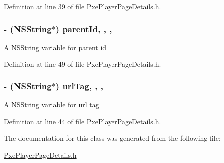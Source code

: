 Definition at line 39 of file Pxe\-Player\-Page\-Details.\-h.

\hypertarget{interface_pxe_player_page_details_a89b10d9e8c8dd323eab65c4675596f80}{
\subsubsection[{parent\-Id}]{\setlength{\rightskip}{0pt plus 5cm}-\/ (N\-S\-String$\ast$) parent\-Id\hspace{0.3cm}{\ttfamily [read]}, {\ttfamily [write]}, {\ttfamily [nonatomic]}, {\ttfamily [retain]}}}\label{interface_pxe_player_page_details_a89b10d9e8c8dd323eab65c4675596f80}
A N\-S\-String variable for parent id 

Definition at line 49 of file Pxe\-Player\-Page\-Details.\-h.

\hypertarget{interface_pxe_player_page_details_ad234d8017a3d5b7d76877bf682b879df}{
\subsubsection[{url\-Tag}]{\setlength{\rightskip}{0pt plus 5cm}-\/ (N\-S\-String$\ast$) url\-Tag\hspace{0.3cm}{\ttfamily [read]}, {\ttfamily [write]}, {\ttfamily [nonatomic]}, {\ttfamily [retain]}}}\label{interface_pxe_player_page_details_ad234d8017a3d5b7d76877bf682b879df}
A N\-S\-String variable for url tag 

Definition at line 44 of file Pxe\-Player\-Page\-Details.\-h.



The documentation for this class was generated from the following file\-:\begin{DoxyCompactItemize}
\item 
\hyperlink{_pxe_player_page_details_8h}{Pxe\-Player\-Page\-Details.\-h}\end{DoxyCompactItemize}
